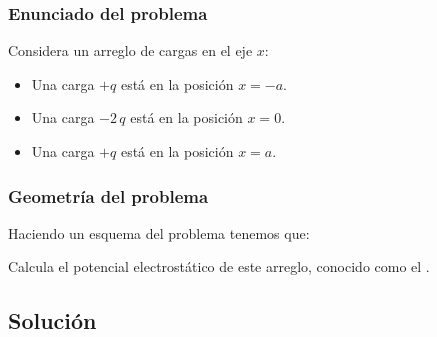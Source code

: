 \documentclass[12pt]{beamer}
\begin{document}
\begin{frame}
\frametitle{Enunciado del problema}
Considera un arreglo de cargas en el eje $x$:
\pause
\begin{itemize}[<+->]
\item Una carga $+q$ está en la posición $x = -a$.
\item Una carga $-2 \, q$ está en la posición $x = 0$.
\item Una carga $+q$ está en la posición $x = a$.
\end{itemize}
\end{frame}
\begin{frame}
\frametitle{Geometría del problema}
Haciendo un esquema del problema tenemos que:
\pause
\begin{figure}
    \centering
    
\end{figure}
\pause
Calcula el potencial electrostático de este arreglo, conocido como el .
\end{frame}

\subsection{Solución}
\end{document}

